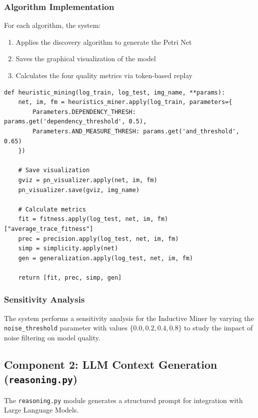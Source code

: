 \documentclass[a4paper,twoside,12pt]{article}
\begin{document}
\subsubsection{Algorithm Implementation}

For each algorithm, the system:
\begin{enumerate}
    \item Applies the discovery algorithm to generate the Petri Net
    \item Saves the graphical visualization of the model
    \item Calculates the four quality metrics via token-based replay
\end{enumerate}

\begin{lstlisting}[caption={Example: Heuristic Miner}]
def heuristic_mining(log_train, log_test, img_name, **params):
    net, im, fm = heuristics_miner.apply(log_train, parameters={
        Parameters.DEPENDENCY_THRESH: params.get('dependency_threshold', 0.5),
        Parameters.AND_MEASURE_THRESH: params.get('and_threshold', 0.65)
    })
    
    # Save visualization
    gviz = pn_visualizer.apply(net, im, fm)
    pn_visualizer.save(gviz, img_name)
    
    # Calculate metrics
    fit = fitness.apply(log_test, net, im, fm)["average_trace_fitness"]
    prec = precision.apply(log_test, net, im, fm)
    simp = simplicity.apply(net)
    gen = generalization.apply(log_test, net, im, fm)
    
    return [fit, prec, simp, gen]
\end{lstlisting}

\subsubsection{Sensitivity Analysis}

The system performs a sensitivity analysis for the Inductive Miner by varying the \texttt{noise\_threshold} parameter with values $\{0.0, 0.2, 0.4, 0.8\}$ to study the impact of noise filtering on model quality.

\subsection{Component 2: LLM Context Generation (\texttt{reasoning.py})}

The \texttt{reasoning.py} module generates a structured prompt for integration with Large Language Models.
\end{document}
